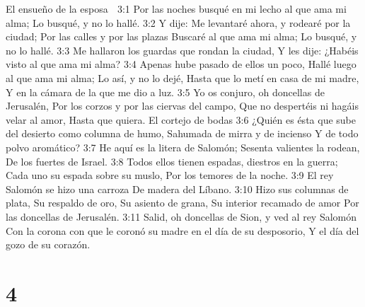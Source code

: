 El ensueño de la esposa  

3:1 Por las noches busqué en mi lecho al que ama mi alma;  
Lo busqué, y no lo hallé.  
3:2 Y dije: Me levantaré ahora, y rodearé por la ciudad;  
Por las calles y por las plazas  
Buscaré al que ama mi alma; 
Lo busqué, y no lo hallé.  
3:3 Me hallaron los guardas que rondan la ciudad,  
Y les dije: ¿Habéis visto al que ama mi alma?  
3:4 Apenas hube pasado de ellos un poco,  
Hallé luego al que ama mi alma;  
Lo así, y no lo dejé,  
Hasta que lo metí en casa de mi madre,  
Y en la cámara de la que me dio a luz.  
3:5 Yo os conjuro, oh doncellas de Jerusalén,  
Por los corzos y por las ciervas del campo,  
Que no despertéis ni hagáis velar al amor,  
Hasta que quiera.  
El cortejo de bodas 
3:6 ¿Quién es ésta que sube del desierto como columna de humo,  
Sahumada de mirra y de incienso  
Y de todo polvo aromático?  
3:7 He aquí es la litera de Salomón;  
Sesenta valientes la rodean,  
De los fuertes de Israel.  
3:8 Todos ellos tienen espadas, diestros en la guerra; 
Cada uno su espada sobre su muslo,  
Por los temores de la noche.  
3:9 El rey Salomón se hizo una carroza  
De madera del Líbano.  
3:10 Hizo sus columnas de plata,  
Su respaldo de oro,  
Su asiento de grana,  
Su interior recamado de amor  
Por las doncellas de Jerusalén.  
3:11 Salid, oh doncellas de Sion, y ved al rey Salomón  
Con la corona con que le coronó su madre en el día de su desposorio,  
Y el día del gozo de su corazón. 

\chapter{4}

